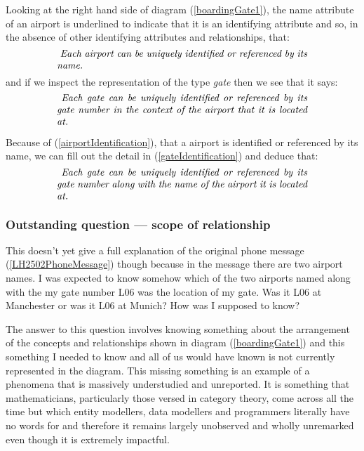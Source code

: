 \mynote
Looking at the right hand side of diagram (\ref{boardingGate1}),
the name attribute of an airport is underlined to indicate that
it is an identifying attribute and so, in the absence of other identifying attributes and relationships,
that:
\begin{equation}
\label{airportIdentification}
\text{\parbox{9cm}{\textit{
Each airport can be uniquely identified or referenced by its name.}}}
\end{equation}
and if we inspect the representation of the type \textit{gate} then we see that it says:
\begin{equation}
\label{gateIdentification}
\text{\parbox{9cm}{\textit{
Each gate can be uniquely identified or referenced by its gate number in the context of the airport that it is located at.}}}
\end{equation}

\mynote
Because of (\ref{airportIdentification}), that a airport is identified or referenced by its name,  we can fill out the detail in (\ref{gateIdentification}) and deduce that:
\begin{equation}
\label{gateNetIdentification}
\text{\parbox{9cm}{\textit{
Each gate can be uniquely identified or referenced by its gate number along with the name of the airport it is located at.}}}
\end{equation}
\subsubsection{Outstanding question --- scope of relationship}
This doesn't yet give a full explanation of the original phone message 
(\ref{LH2502PhoneMessage}) though because
in the message there are two airport names. 
I was expected to know somehow which of the two airports named along with the my gate number L06
was the location of my gate.  Was it L06 at Manchester or was it L06 at Munich? How was I supposed to know? 

\mynote The answer to this question involves knowing something about the arrangement
of the concepts and relationships shown in diagram (\ref{boardingGate1}) 
and this something I needed to know and all of us would have known is not
currently represented in the diagram.  This missing something is an example of a phenomena  
that is massively understudied and unreported. It is something that mathematicians, particularly those versed in category theory, come across all the time but which entity modellers, data modellers and programmers literally have no words for and therefore it remains largely unobserved and wholly unremarked even though it is extremely impactful.

